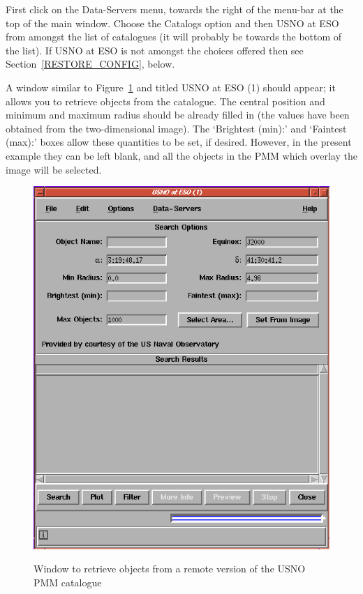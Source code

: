 \documentclass[twoside,11pt]{article}
\begin{document}
\begin{enumerate}
   First click on the {\sf Data-Servers} menu, towards the right of the
   menu-bar at the top of the main window.  Choose the {\sf Catalogs}
   option and then {\sf USNO at ESO} from amongst the list of catalogues
   (it will probably be towards the bottom of the list).  If {\sf USNO at
   ESO} is not amongst the choices offered then see
   Section~\ref{RESTORE_CONFIG}, below.

   A window similar to Figure~\ref{RETRIEV_R_PMM} and titled {\sf USNO at
   ESO (1)} should appear; it allows you to retrieve objects from the
   catalogue.  The central position and minimum and maximum radius should
   be already filled in (the values have been obtained from the
   two-dimensional image).  The `{\sf Brightest (min):}' and `{\sf Faintest
   (max):}' boxes allow these quantities to be set, if desired.  However,
   in the present example they can be left blank, and all the objects in
   the PMM which overlay the image will be selected.

  \begin{figure}[htbp]
     \centering
     \includegraphics[totalheight=4in]{sc17_retriev_r_pmm.ps}
     \begin{quote}
     \caption[Window to retrieve a remote catalogue]
      {Window to retrieve objects from a remote version of the USNO
      PMM catalogue
     \label{RETRIEV_R_PMM} }
     \end{quote}
  \end{figure}


\end{enumerate}
\end{document}
